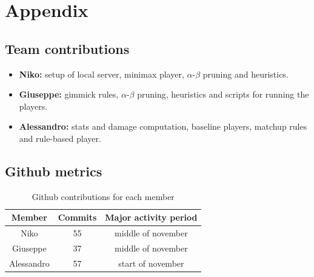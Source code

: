 \appendix
\section{Appendix}\label{sec:appendix}
\subsection{Team contributions}\label{appendix:team_contributions}
\begin{itemize}
    \item \textbf{Niko:} setup of local server, minimax player, $\alpha$-$\beta$ pruning and heuristics.
    \item \textbf{Giuseppe:} gimmick rules, $\alpha$-$\beta$ pruning, heuristics and scripts for running the players.
    \item \textbf{Alessandro:} stats and damage computation, baseline players, matchup rules and rule-based player.
\end{itemize}

\subsection{Github metrics}\label{appendix:github_metrics}
\begin{table}[!htbp]
    \footnotesize
    \centering
    \begin{tabular}{c|c|c}
        \hline \hline
         \textbf{Member} & \textbf{Commits} & \textbf{Major activity period} \\ \hline \hline
         Niko & 55 & middle of november \\ \hline
         Giuseppe & 37 & middle of november \\ \hline
         Alessandro & 57 & start of november \\ \hline \hline
    \end{tabular}
    \caption{Github contributions for each member}
    \label{tab:git_contributions}
\end{table}

